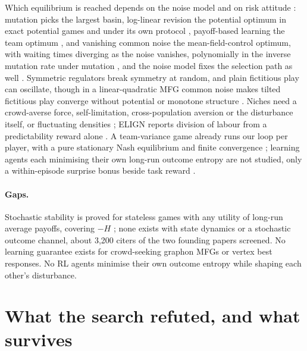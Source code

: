 \documentclass[10pt]{article}
\begin{document}
Which equilibrium is reached depends on the noise model and on risk attitude \citep{Mohammadi-entropic26}: mutation picks the largest basin, log-linear revision the potential optimum in exact potential games and under its own protocol \citep{Blume-statistical93,AlosFerrer-logit10}, payoff-based learning the team optimum \citep{PradelskiYoung-learning12,Marden-achieving14}, and vanishing common noise the mean-field-control optimum, with waiting times diverging as the noise vanishes, polynomially in the inverse mutation rate under mutation \citep{Kandori-learning93}, and the noise model fixes the selection path as well \citep{Jaleel-path18}. Symmetric regulators break symmetry at random, and plain fictitious play can oscillate, though in a linear-quadratic MFG common noise makes tilted fictitious play converge without potential or monotone structure \citep{Delarue-exploration21}. Niches need a crowd-averse force, self-limitation, cross-population aversion or the disturbance itself, or fluctuating densities \citep{Armstrong-competitive80}; ELIGN reports division of labour from a predictability reward alone \citep{Ma-elign22}. A team-variance game already runs our loop per player, with a pure stationary Nash equilibrium and finite convergence \citep{Xia-team25}; learning agents each minimising their own long-run outcome entropy are not studied, only a within-episode surprise bonus beside task reward \citep{Sun-improving23}.

\paragraph{Gaps.}
Stochastic stability is proved for stateless games with any utility of long-run average payoffs, covering $-H$ \citep{Ramakrishnan-completely19}; none exists with state dynamics or a stochastic outcome channel, about 3{,}200 citers of the two founding papers screened. No learning guarantee exists for crowd-seeking graphon MFGs or vertex best responses. No RL agents minimise their own outcome entropy while shaping each other's disturbance.

\section{What the search refuted, and what survives}
\end{document}
